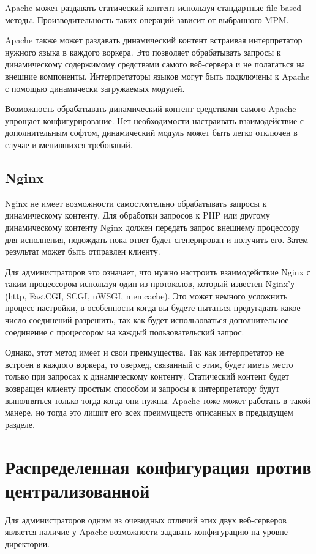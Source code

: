 \documentclass[14pt, a4paper]{article}
\begin{document}
Apache может раздавать статический контент используя стандартные file-based методы. 
Производительность таких операций зависит от выбранного MPM.


Apache также может раздавать динамический контент встраивая интерпретатор нужного языка 
в каждого воркера. Это позволяет обрабатывать запросы к динамическому содержимому средствами 
самого веб-сервера и не полагаться на внешние компоненты. Интерпретаторы языков могут быть подключены 
к Apache с помощью динамически загружаемых модулей.


Возможность обрабатывать динамический контент средствами самого Apache упрощает 
конфигурирование. Нет необходимости настраивать взаимодействие с дополнительным софтом, 
динамический модуль может быть легко отключен в случае изменившихся требований.

\subsection*{Nginx}

Nginx не имеет возможности самостоятельно обрабатывать запросы к динамическому контенту. 
Для обработки запросов к PHP или другому динамическому контенту Nginx должен передать запрос 
внешнему процессору для исполнения, подождать пока ответ будет сгенерирован и получить его. 
Затем результат может быть отправлен клиенту.


Для администраторов это означает, что нужно настроить взаимодействие Nginx с таким процессором 
используя один из протоколов, который известен Nginx'у (http, FastCGI, SCGI, uWSGI, memcache). 
Это может немного усложнить процесс настройки, в особенности когда вы будете пытаться предугадать 
какое число соединений разрешить, так как будет использоваться дополнительное соединение с процессором
на каждый пользовательский запрос.


Однако, этот метод имеет и свои преимущества. Так как интерпретатор не встроен в каждого воркера, 
то оверхед, связанный с этим, будет иметь место только при запросах к динамическому контенту. 
Статический контент будет возвращен клиенту простым способом и запросы к интерпретатору будут 
выполняться только тогда когда они нужны. Apache тоже может работать в такой манере, но тогда 
это лишит его всех преимуществ описанных в предыдущем разделе.\\



\section*{Распределенная конфигурация против централизованной}
Для администраторов одним из очевидных отличий этих двух веб-серверов является наличие 
у Apache возможности задавать конфигурацию на уровне директории.
\end{document}

